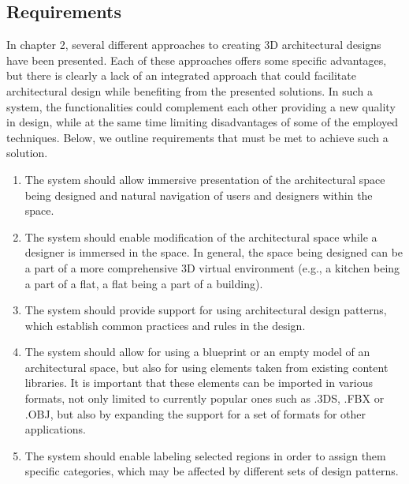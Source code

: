 \documentclass[runningheads]{llncs}
\begin{document}
\subsection{Requirements}
In chapter 2, several different approaches to creating 3D architectural designs have been presented. Each of these approaches offers some specific advantages, but there is clearly a lack of an integrated approach that could facilitate architectural design while benefiting from the presented solutions. In such a system, the functionalities could complement each other providing a new quality in design, while at the same time limiting disadvantages of some of the employed techniques. Below, we outline requirements that must be met to achieve such a solution.

\begin{enumerate}
\item	\label{req-vr} The system should allow immersive presentation of the architectural space being designed and natural navigation of users and designers within the space.\\

\item	\label{req-edit-vr} The system should enable modification of the architectural space while a designer is immersed in the space. In general, the space being designed can be a part of a more comprehensive 3D virtual environment (e.g., a kitchen being a part of a flat, a flat being a part of a building).\\

\item \label{req-pattnerns} The system should provide support for using architectural design patterns, which establish common practices and rules in the design. \\

\item \label{req-libraries} The system should allow for using a blueprint or an empty model of an architectural space, but also for using elements taken from existing content libraries. It is important that these elements can be imported in various formats, not only limited to currently popular ones such as .3DS, .FBX or .OBJ, but also by expanding the support for a set of formats for other applications.\\

\item	\label{req-labeling} The system should enable labeling selected regions in order to assign them specific categories, which may be affected by different sets of design patterns.\\



\end{enumerate}
\end{document}
